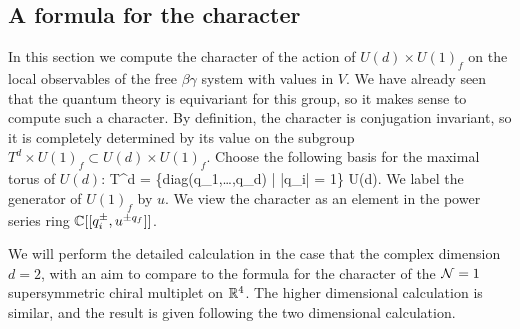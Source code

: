 %
%

\subsection{A formula for the character}

In this section we compute the character of the action of $U(d) \times U(1)_f$ on the local observables of the free $\beta\gamma$ system with values in $V$. 
We have already seen that the quantum theory is equivariant for this group, so it makes sense to compute such a character.
By definition, the character is conjugation invariant, so it is completely determined by its value on the subgroup $T^d \times U(1)_f \subset U(d) \times U(1)_f$. 
Choose the following basis for the maximal torus of $U(d)$: 
\ben
T^d = \{{\rm diag}(q_1,\ldots,q_d) \; | \; |q_i| = 1\} \subset U(d).
\een 
We label the generator of $U(1)_f$ by $u$. 
We view the character as an element in the power series ring $\mathbb C[[q_i^{\pm}, u^{\pm q_f}]]$. 

We will perform the detailed calculation in the case that the complex dimension $d = 2$, with an aim to compare to the formula for the character of the $\mathcal N = 1$ supersymmetric chiral multiplet on $\mathbb R^4$. 
The higher dimensional calculation is similar, and the result is given following the two dimensional calculation.

